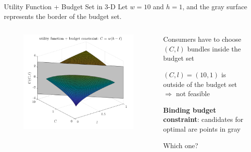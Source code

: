 \documentclass[11pt,aspectratio=169,usenames,dvipsnames]{beamer}
\let\tempone\itemize
\let\temptwo\enditemize
\renewenvironment{itemize}{\tempone\addtolength{\itemsep}{\fill}}{\temptwo}
\begin{document}
\begin{frame}{Utility Function + Budget Set in 3-D}
\label{slide:Utility_Function___Budget_Set_in_3_D}
    Let $ w = 10 $ and $ h = 1 $, and the gray surface represents the \alert{border} of the budget set.
    \begin{columns}
        \begin{column}{0.6\textwidth}
            \begin{figure}
                \includegraphics[width=.9\textwidth]{./figures/UtilityBudget.png}
            \end{figure}
        \end{column}
        \begin{column}{0.4\textwidth}
            \begin{itemize}
                \item Consumers have to choose $ ( C, l ) $ bundles \alert{inside the budget set}
                \begin{itemize}
                    \item $ ( C, l ) = ( 10, 1 ) $ is \alert{outside} of the budget set $ \Rightarrow  $ not feasible
                \end{itemize}
                \item \textbf{Binding budget constraint}: candidates for optimal are points in gray
                \item Which one?
            \end{itemize}
        \end{column}
    \end{columns}
\end{frame}
\end{document}
